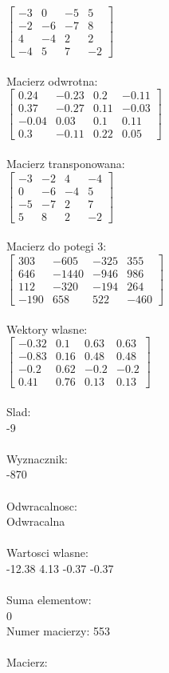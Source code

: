 \documentclass[a4paper,12pt]{article}
\begin{document}
$\begin{bmatrix} -3&0&-5&5\\-2&-6&-7&8\\4&-4&2&2\\-4&5&7&-2 \end{bmatrix}$
\\
\\
Macierz odwrotna:\\

$\begin{bmatrix} 0.24&-0.23&0.2&-0.11\\0.37&-0.27&0.11&-0.03\\-0.04&0.03&0.1&0.11\\0.3&-0.11&0.22&0.05 \end{bmatrix}$
\\
\\
Macierz transponowana:\\

$\begin{bmatrix} -3&-2&4&-4\\0&-6&-4&5\\-5&-7&2&7\\5&8&2&-2 \end{bmatrix}$
\\
\\
Macierz do potegi 3:\\

$\begin{bmatrix} 303&-605&-325&355\\646&-1440&-946&986\\112&-320&-194&264\\-190&658&522&-460 \end{bmatrix}$
\\
\\
Wektory wlasne:\\

$\begin{bmatrix} -0.32&0.1&0.63&0.63\\-0.83&0.16&0.48&0.48\\-0.2&0.62&-0.2&-0.2\\0.41&0.76&0.13&0.13 \end{bmatrix}$
\\
\\
Slad:\\
-9
\\
\\
Wyznacznik:\\
-870
\\
\\
Odwracalnosc:\\
Odwracalna
\\
\\
Wartosci wlasne:\\
-12.38 4.13 -0.37 -0.37
\\
\\
Suma elementow:\\
0
\\
\newpage
Numer macierzy:
553
\\
\\
Macierz:\\
\end{document}
